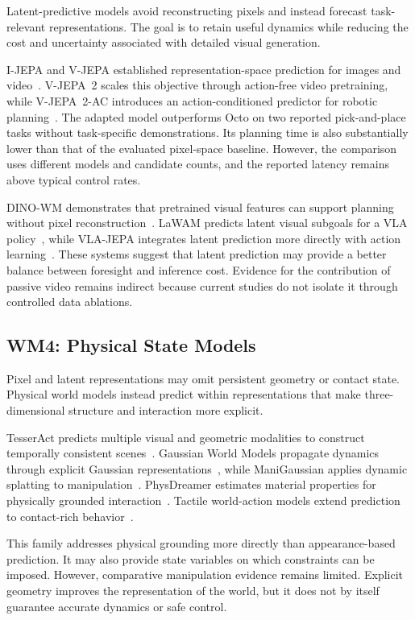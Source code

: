\documentclass{ieeeaccess}
\begin{document}
Latent-predictive models avoid reconstructing pixels and instead forecast task-relevant representations. The goal is to retain useful dynamics while reducing the cost and uncertainty associated with detailed visual generation.

I-JEPA and V-JEPA established representation-space prediction for images and video~\cite{ijepa,vjepa}. V-JEPA~2 scales this objective through action-free video pretraining, while V-JEPA~2-AC introduces an action-conditioned predictor for robotic planning~\cite{vjepa2}. The adapted model outperforms Octo on two reported pick-and-place tasks without task-specific demonstrations. Its planning time is also substantially lower than that of the evaluated pixel-space baseline. However, the comparison uses different models and candidate counts, and the reported latency remains above typical control rates.

DINO-WM demonstrates that pretrained visual features can support planning without pixel reconstruction~\cite{dinowm}. LaWAM predicts latent visual subgoals for a VLA policy~\cite{lawam}, while VLA-JEPA integrates latent prediction more directly with action learning~\cite{jepavla}. These systems suggest that latent prediction may provide a better balance between foresight and inference cost. Evidence for the contribution of passive video remains indirect because current studies do not isolate it through controlled data ablations.

\subsection{WM4: Physical State Models}
\label{sec:wm4}

Pixel and latent representations may omit persistent geometry or contact state. Physical world models instead predict within representations that make three-dimensional structure and interaction more explicit.

TesserAct predicts multiple visual and geometric modalities to construct temporally consistent scenes~\cite{tesseract}. Gaussian World Models propagate dynamics through explicit Gaussian representations~\cite{gaussianworld}, while ManiGaussian applies dynamic splatting to manipulation~\cite{manigaussian}. PhysDreamer estimates material properties for physically grounded interaction~\cite{physdreamer}. Tactile world-action models extend prediction to contact-rich behavior~\cite{dreamtac,touchworld}.

This family addresses physical grounding more directly than appearance-based prediction. It may also provide state variables on which constraints can be imposed. However, comparative manipulation evidence remains limited. Explicit geometry improves the representation of the world, but it does not by itself guarantee accurate dynamics or safe control.
\end{document}
